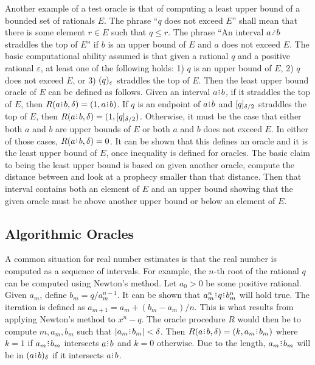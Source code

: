 \documentclass[12pt]{article}
\begin{document}
Another example of a test oracle is that of computing a least upper bound of a bounded set of rationals $E$. The phrase ``$q$ does not exceed $E$'' shall mean that there is some element $r \in E$ such that $q \leq r$. The phrase ``An interval $a \lte b$ straddles the top of $E$'' if $b$ is an upper bound of $E$ and $a$ does not exceed $E$. The basic computational ability assumed is that given a rational $q$ and a positive rational $\varepsilon$, at least one of the following holds: 1) $q$ is an upper bound of $E$, 2) $q$ does not exceed $E$, or 3)  $\halo[\varepsilon]{q}$ straddles the top of $E$. Then the least upper bound oracle of $E$ can be defined as follows. Given an interval $a \rint  b$, if it straddles the top of $E$, then $R(a \rint  b, \delta) = (1, a\rint b)$. If $q$ is an endpoint of $a\rint b$ and  $\clhalo[\delta/2]{q}$ straddles the top of $E$, then $R(a\rint b, \delta)= (1, \clhalo[\delta/2]{q})$. Otherwise, it must be the case that either both $a$ and $b$ are upper bounds of $E$ or both $a$ and $b$ does not exceed $E$. In either of those cases, $R(a \rint b, \delta) = 0$. It can be shown that this defines an oracle and it is the least upper bound of $E$, once inequality is defined for oracles. The basic claim to being the least upper bound is based on given another oracle, compute the distance between and look at a prophecy smaller than that distance. Then that interval contains both an element of $E$ and an upper bound showing that the given oracle must be above another upper bound or below an element of $E$.




\subsection{Algorithmic Oracles}


A common situation for real number estimates is that the real number is computed as a sequence of intervals. For example, the $n$-th root of the rational $q$ can be computed using Newton's method. Let $a_0 >0$ be some positive rational. Given $a_m$, define $b_m = q/a_m^{n-1}$. It can be shown that $a_m^n \rint  q \rint  b_m^n$ will hold true. The iteration is defined as $a_{m+1} = a_m + (b_m - a_m)/n$. This is what results from applying Newton's method to $x^n - q$. The oracle procedure $R$ would then be to compute $m, a_m, b_m$ such that $|a_m \rint  b_m| < \delta$.  Then $R(a\rint b, \delta) = (k, a_m\rint b_m)$ where $k=1$ if $a_m\rint b_m$ intersects $a\rint b$ and $k =0$ otherwise. Due to the length, $a_m\rint b_m$ will be in $\halo{a\rint b}$ if it intersects $a\rint b$. 
\end{document}
